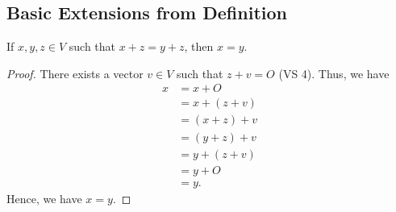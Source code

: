 \subsection{Basic Extensions from Definition}

\begin{theorem}
    If \( x,y,z \in V  \) such that \( x + z = y + z  \), then \( x = y  \).
\end{theorem}
\begin{proof}
There exists a vector \( v \in V  \) such that \( z + v = O  \) (VS 4). Thus, we have
    \begin{align*}
        x &= x + O  \\
            &= x + (z + v ) \\
            &= (x+ z) + v  \\
            &= (y+z) + v \\
            &= y + (z + v) \\
            &= y + O \\ 
            &= y.
    \end{align*}
    Hence, we have \( x = y  \).
\end{proof}


